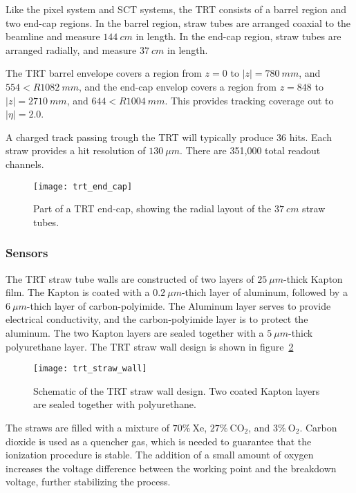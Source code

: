 Like the pixel system and SCT systems, the TRT consists of a barrel region and two end-cap regions.
In the barrel region, straw tubes are arranged coaxial to the beamline and measure $144~cm$ in length.
In the end-cap region, straw tubes are arranged radially, and measure $37~cm$ in length.\cite{atlas-detector-2008}

The TRT barrel envelope covers a region from $z = 0$ to $|z|  = 780~mm$, and $554 < R 1082~mm$,
and the end-cap envelop covers a region from $z = 848$ to $|z|  = 2710~mm$, and $644 < R 1004~mm$.
This provides tracking coverage out to $|\eta| = 2.0$.\cite{atlas-detector-2008}

A charged track passing trough the TRT will typically produce 36 hits.
Each straw provides a hit resolution of $130~\mu m$.
There are 351,000 total readout channels.

\begin{figure}[!ht]\centering
\texttt{[image: trt\_end\_cap]}
\caption{Part of a TRT end-cap, showing the radial layout of the $37~cm$ straw tubes.}
\label{fig:trt_end_cap}\cite{trt-2013}
\end{figure}

\subsubsection{Sensors}

The TRT straw tube walls are constructed of two layers of $25~\mu m$-thick Kapton film.
The Kapton is coated with a $0.2~\mu m$-thich layer of aluminum, followed by a $6~\mu m$-thich layer of carbon-polyimide.
The Aluminum layer serves to provide electrical conductivity, and the carbon-polyimide layer is to protect the aluminum.
The two Kapton layers are sealed together with a $5~\mu m$-thick polyurethane layer.\cite{trt-2013}
The TRT straw wall design is shown in figure~\ref{fig:trt_straw_wall}

\begin{figure}[!ht]\centering
\texttt{[image: trt\_straw\_wall]}
\caption{Schematic of the TRT straw wall design. Two coated Kapton layers are sealed together with polyurethane.}
\label{fig:trt_straw_wall}\cite{trt-2013}
\end{figure}

The straws are filled with a mixture of $70\%~\mathrm{Xe}$, $27\%~\mathrm{CO_2}$,
and $3\%~\mathrm{O_2}$.
Carbon dioxide is used as a quencher gas, which is needed to guarantee that the ionization procedure is stable.
The addition of a small amount of oxygen increases the voltage difference between the working point and the breakdown voltage,
further stabilizing the process.\cite{trt-2013}


